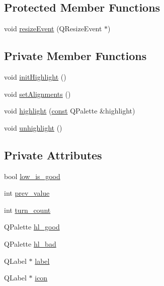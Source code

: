 \subsection*{Protected Member Functions}
\begin{DoxyCompactItemize}
\item 
void \hyperlink{classNetHackQtLabelledIcon_ab1ab944aa17432c46fc8cf532f189658}{resize\+Event} (Q\+Resize\+Event $\ast$)
\end{DoxyCompactItemize}
\subsection*{Private Member Functions}
\begin{DoxyCompactItemize}
\item 
void \hyperlink{classNetHackQtLabelledIcon_a6d0b902eb21067a189cd89049d605f64}{init\+Highlight} ()
\item 
void \hyperlink{classNetHackQtLabelledIcon_a5ab2f5c240053f7336e3952e01ba446a}{set\+Alignments} ()
\item 
void \hyperlink{classNetHackQtLabelledIcon_a558b825d78338453ffac7ea11ea1307e}{highlight} (\hyperlink{tradstdc_8h_a2c212835823e3c54a8ab6d95c652660e}{const} Q\+Palette \&highlight)
\item 
void \hyperlink{classNetHackQtLabelledIcon_abe90bd26086d3347d0a45365d526a5c7}{unhighlight} ()
\end{DoxyCompactItemize}
\subsection*{Private Attributes}
\begin{DoxyCompactItemize}
\item 
bool \hyperlink{classNetHackQtLabelledIcon_a63f66d9df2dc8bef4fcac182d4edf467}{low\+\_\+is\+\_\+good}
\item 
int \hyperlink{classNetHackQtLabelledIcon_ae3783d07960d74d27b79e5a1266afa5d}{prev\+\_\+value}
\item 
int \hyperlink{classNetHackQtLabelledIcon_ae4eb385095d1e0b90e863947359cf135}{turn\+\_\+count}
\item 
Q\+Palette \hyperlink{classNetHackQtLabelledIcon_a4d84e51957e327c243077f49d7d130b2}{hl\+\_\+good}
\item 
Q\+Palette \hyperlink{classNetHackQtLabelledIcon_a15a4a0362b4f8fb35d894144e76fcb72}{hl\+\_\+bad}
\item 
Q\+Label $\ast$ \hyperlink{classNetHackQtLabelledIcon_aa2a1e63d7c0ded20b3327c57a0f2b859}{label}
\item 
Q\+Label $\ast$ \hyperlink{classNetHackQtLabelledIcon_a4e33054b1434bdc8975812ee48b349d1}{icon}
\end{DoxyCompactItemize}


